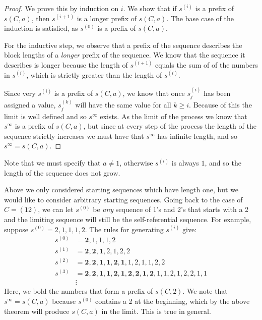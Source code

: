 \documentclass[runningheads,a4paper]{llncs}
\begin{document}
\begin{proof}
We prove this by induction on $i$. We show that if $s^{(i)}$ is a prefix of $s(C,a)$, then $s^{(i+1)}$ is a longer prefix of $s(C,a)$. The base case of the induction is satisfied, as $s^{(0)}$ is a prefix of $s(C,a)$.

For the inductive step, we observe that a prefix of the sequence describes the block lengths of a \emph{longer} prefix of the sequence. We know that the sequence it describes is longer because the length of $s^{(i+1)}$ equals the sum of of the numbers in $s^{(i)}$, which is strictly greater than the length of $s^{(i)}$. 


Since very $s^{(i)}$ is a prefix of $s(C,a)$, we know that once $s^{(i)}_{j}$ has been assigned a value, $s^{(k)}_{j}$ will have the same value for all $k \geq i$. Because of this the limit is well defined and so $s^{\infty}$ exists. As the limit of the process we know that $s^{\infty}$ is a prefix of $s(C,a)$, but since at every step of the process the length of the sequence strictly increases we must have that $s^{\infty}$ has infinite length, and so $s^{\infty} = s(C,a)$. 
\end{proof}

Note that we must specify that $a \neq 1$, otherwise $s^{(i)}$ is always $1$, and so the length of the sequence does not grow.  

Above we only considered starting sequences which have length one,  but we would like to consider arbitrary starting sequences. Going back to the case of $C = (1 2)$, we can let $s^{(0)}$ be \emph{any} sequence of 1's and 2's that starts with a 2 and the limiting sequence will still be the self-referential sequence.
For example, suppose $s^{(0)} = 2,1,1,1,2$. The rules for generating $s^{(i)}$ give:
\begin{align*}
s^{(0)}&= \mathbf{2},1,1,1,2\\
s^{(1)} &= \mathbf{2,2,1},2,1,2,2\\
s^{(2)} &= \mathbf{2,2,1,1,2,1},1,2,1,1,2,2\\
s^{(3)} &= \mathbf{2,2,1,1,2,1,2,2,1,2},1,1,2,1,2,2,1,1\\
&\vdots
\end{align*}
Here, we bold the numbers that form a prefix of $s(C,2)$. We note that $s^\infty = s(C,a)$ because $s^{(0)}$ contains a 2 at the beginning, which by the above theorem will produce $s(C,a)$ in the limit. This is true in general. 
\end{document}

